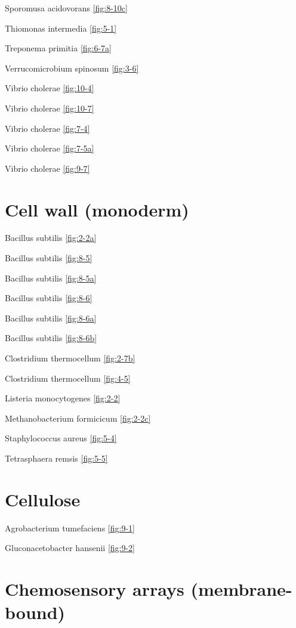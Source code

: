 \documentclass[]{tufte-book}
\begin{document}
Sporomusa acidovorans \ref{fig:8-10c}

Thiomonas intermedia \ref{fig:5-1}

Treponema primitia \ref{fig:6-7a}

Verrucomicrobium spinosum \ref{fig:3-6}

Vibrio cholerae \ref{fig:10-4}

Vibrio cholerae \ref{fig:10-7}

Vibrio cholerae \ref{fig:7-4}

Vibrio cholerae \ref{fig:7-5a}

Vibrio cholerae \ref{fig:9-7}

\hypertarget{cell-wall-monoderm}{%
\section*{Cell wall (monoderm)}\label{cell-wall-monoderm}}

Bacillus subtilis \ref{fig:2-2a}

Bacillus subtilis \ref{fig:8-5}

Bacillus subtilis \ref{fig:8-5a}

Bacillus subtilis \ref{fig:8-6}

Bacillus subtilis \ref{fig:8-6a}

Bacillus subtilis \ref{fig:8-6b}

Clostridium thermocellum \ref{fig:2-7b}

Clostridium thermocellum \ref{fig:4-5}

Listeria monocytogenes \ref{fig:2-2}

Methanobacterium formicicum \ref{fig:2-2c}

Staphylococcus aureus \ref{fig:5-4}

Tetrasphaera remsis \ref{fig:5-5}

\hypertarget{cellulose}{%
\section*{Cellulose}\label{cellulose}}

Agrobacterium tumefaciens \ref{fig:9-1}

Gluconacetobacter hansenii \ref{fig:9-2}

\hypertarget{chemosensory-arrays-membrane-bound}{%
\section*{Chemosensory arrays (membrane-bound)}\label{chemosensory-arrays-membrane-bound}}
\end{document}
